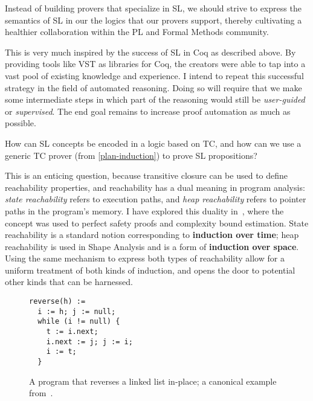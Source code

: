 \begin{proposal}
Instead of building provers that specialize in SL, we should strive to express the semantics of SL in our the logics that our provers support, thereby cultivating a healthier collaboration within the PL and Formal Methods community.
\end{proposal}

This is very much inspired by the success of SL in Coq as described above.
By providing tools like VST as libraries for Coq, the creators were able to tap into a vast pool of existing knowledge and experience.
I intend to repeat this successful strategy in the field of automated reasoning.
Doing so will require that we make some intermediate steps in which part of the reasoning would still be
\emph{user-guided} or \emph{supervised}.
The end goal remains to increase proof automation as much as possible.

\begin{researchquestion}
How can SL concepts be encoded in a logic based on TC,
and how can we use a generic TC prover (from \autoref{plan-induction})
to prove SL propositions?
\end{researchquestion}

This is an enticing question, because transitive closure can be used to define reachability properties,
and reachability has a dual meaning in program analysis: \emph{state reachability} refers to execution paths,
and \emph{heap reachability} refers to pointer paths in the program's memory.
I have explored this duality in~\cite{squeezers},
where the concept was used to perfect safety proofs and complexity bound estimation.
State reachability is a standard notion corresponding to \textbf{induction over time};
heap reachability is used in Shape Analysis and is a form of \textbf{induction over space}.
Using the same mechanism to express both types of reachability allow for a uniform treatment of both kinds of induction, and opens the door to potential other kinds that can be harnessed.

\begin{figure} 
\begin{lstlisting}[basicstyle=\linespread{1.36}\ttfamily\fontsize{10pt}{8pt}\selectfont]
reverse(h) :=
  i := h; j := null;
  while (i != null) {
    t := i.next;
    i.next := j; j := i;
    i := t;
  }
\end{lstlisting}
\caption{A program that reverses a linked list in-place;
 a canonical example from~\cite{reynolds2002}.}
\end{figure}

